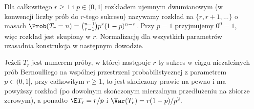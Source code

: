 \begin{definicja}
Dla całkowitego $r\geq1$ i $p\in(0,1]$ rozkładem ujemnym
dwumianowym (w konwencji liczby prób do $r$-tego sukcesu)
nazywamy rozkład na $\{r,r+1,\ldots\}$ o masach
$\Prob(T_r=n)=\binom{n-1}{r-1}p^r(1-p)^{n-r}$.
Przy $p=1$ przyjmujemy $0^0=1$, więc rozkład jest
skupiony w $r$. Normalizację dla wszystkich parametrów
uzasadnia konstrukcja w następnym dowodzie.
\end{definicja}

\begin{stwierdzenie}
Jeżeli $T_r$ jest numerem próby, w której następuje $r$-ty sukces
w ciągu niezależnych prób Bernoulliego na wspólnej przestrzeni
probabilistycznej z parametrem
$p\in(0,1]$, przy całkowitym $r\geq1$, to jest skończony
prawie na pewno i ma powyższy rozkład (po dowolnym
skończonym mierzalnym przedłużeniu na zbiorze zerowym),
a ponadto
$\E T_r=r/p$ i $\Var(T_r)=r(1-p)/p^2$.
\end{stwierdzenie}
